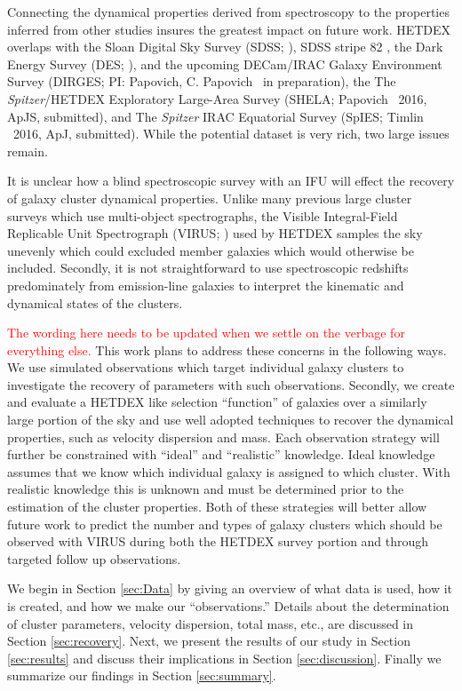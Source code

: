 \documentclass[fleqn,usenatbib]{mnras}
\newcommand{\editorial}[1]{\textcolor{red}{#1}}
\begin{document}
Connecting the dynamical properties derived from spectroscopy to the properties inferred from other studies insures the greatest impact on future work. HETDEX overlaps with the Sloan Digital Sky Survey (SDSS; \citealt{Blanton2001a}), SDSS stripe 82 \citep{Annis2014}, the Dark Energy Survey (DES; \citealt{DES2005}), and the upcoming DECam/IRAC Galaxy Environment Survey (DIRGES; PI: Papovich, C. Papovich \etal\ in preparation), the The \emph{Spitzer}/HETDEX Exploratory Large-Area Survey (SHELA; Papovich \etal\ 2016, ApJS, submitted), and The \emph{Spitzer} IRAC Equatorial Survey (SpIES; Timlin \etal\ 2016, ApJ, submitted). While the potential dataset is very rich, two large issues remain.

It is unclear how a blind spectroscopic survey with an IFU will effect the recovery of galaxy cluster dynamical properties. Unlike many previous large cluster surveys  which use multi-object spectrographs, the Visible Integral-Field Replicable Unit Spectrograph (VIRUS; \citealt{Hill2012}) used by HETDEX samples the sky unevenly which could excluded member galaxies which would otherwise be included. Secondly, it is not straightforward to use spectroscopic redshifts predominately from emission-line galaxies to interpret the kinematic and dynamical states of the clusters.

\editorial{The wording here needs to be updated when we settle on the verbage for everything else.} This work plans to address these concerns in the following ways. We use simulated observations which target individual galaxy clusters to investigate the recovery of parameters with such observations. Secondly, we create and evaluate a HETDEX like selection ``function'' of galaxies over a similarly large portion of the sky and use well adopted techniques to recover the dynamical properties, such as velocity dispersion and mass. Each observation strategy will further be constrained with ``ideal'' and ``realistic'' knowledge. Ideal knowledge assumes that we know which individual galaxy is assigned to which cluster. With realistic knowledge this is unknown and must be determined prior to the estimation of the cluster properties. Both of these strategies will better allow future work to predict the number and types of galaxy clusters which should be observed with VIRUS during both the HETDEX survey portion and through targeted follow up observations.

We begin in Section \ref{sec:Data} by giving an overview of what data is used, how it is created, and how we make our ``observations.'' Details about the determination of cluster parameters, velocity dispersion, total mass, etc., are discussed in Section \ref{sec:recovery}. Next, we present the results of our study in Section \ref{sec:results} and discuss their implications in Section \ref{sec:discussion}. Finally we summarize our findings in Section \ref{sec:summary}.
\end{document}
